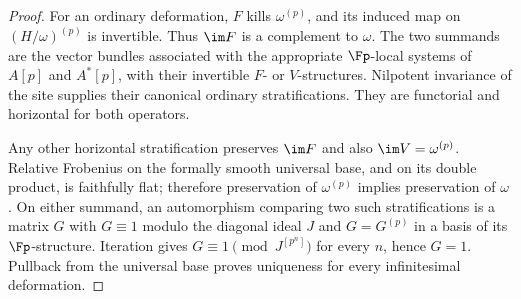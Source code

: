 \begin{proof}
For an ordinary deformation, $F$ kills $\omega^{(p)}$, and its induced map on $(H/\omega)^{(p)}$ is invertible.  Thus $\im F$ is a complement to $\omega$.  The two summands are the vector bundles associated with the appropriate \etale $\Fp$-local systems of $A[p]$ and $A^*[p]$, with their invertible $F$- or $V$-structures.  Nilpotent invariance of the \etale site supplies their canonical ordinary stratifications.  They are functorial and horizontal for both operators.

Any other horizontal stratification preserves $\im F$ and also $\im V=\omega^{(p)}$.  Relative Frobenius on the formally smooth universal base, and on its double product, is faithfully flat; therefore preservation of $\omega^{(p)}$ implies preservation of $\omega$.  On either summand, an automorphism comparing two such stratifications is a matrix $G$ with $G\equiv1$ modulo the diagonal ideal $J$ and $G=G^{(p)}$ in a basis of its \etale $\Fp$-structure.  Iteration gives $G\equiv1\pmod{J^{[p^n]}}$ for every $n$, hence $G=1$.  Pullback from the universal base proves uniqueness for every infinitesimal deformation.
\end{proof}

